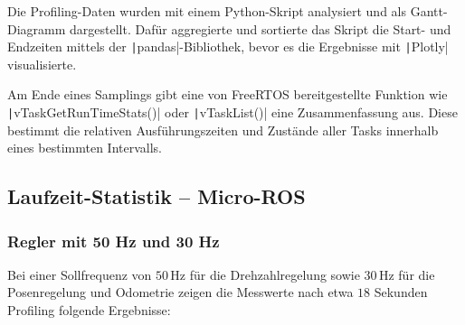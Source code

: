Die Profiling-Daten wurden mit einem Python-Skript analysiert und als
Gantt-Diagramm dargestellt. Dafür aggregierte und sortierte das Skript die
Start- und Endzeiten mittels der \texttt|pandas|-Bibliothek, bevor es
die Ergebnisse mit \texttt|Plotly| visualisierte.

Am Ende eines Samplings gibt eine von FreeRTOS bereitgestellte Funktion wie
\linebreak \texttt|vTaskGetRunTimeStats()| oder
\texttt|vTaskList()| eine Zusammenfassung aus. Diese bestimmt die
relativen Ausführungszeiten und Zustände aller Tasks innerhalb eines bestimmten
Intervalls.

\subsection{Laufzeit-Statistik -- Micro-ROS}

\subsubsection{Regler mit 50 Hz und 30 Hz}

Bei einer Sollfrequenz von $50\,\text{Hz}$ für die Drehzahlregelung sowie
$30\,\text{Hz}$ für die Posenregelung und Odometrie zeigen die Messwerte nach
etwa $18$ Sekunden Profiling folgende Ergebnisse:

